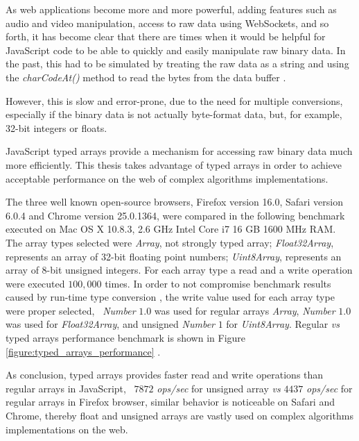 As web applications become more and more powerful, adding features such as audio and video manipulation, access to raw data using WebSockets, and so forth, it has become clear that there are times when it would be helpful for JavaScript code to be able to quickly and easily manipulate raw binary data. In the past, this had to be simulated by treating the raw data as a string and using the \textit{charCodeAt()} method to read the bytes from the data buffer \cite{MDN2013} \cite{TypedArray2013}.

However, this is slow and error-prone, due to the need for multiple conversions, especially if the binary data is not actually byte-format data, but, for example, 32-bit integers or floats.

JavaScript typed arrays provide a mechanism for accessing raw binary data much more efficiently. This thesis takes advantage of typed arrays in order to achieve acceptable performance on the web of complex algorithms implementations.

The three well known open-source browsers, Firefox version 16.0, Safari version 6.0.4 and Chrome version 25.0.1364, were compared in the following benchmark executed on Mac OS X 10.8.3, 2.6 GHz Intel Core i7 16 GB 1600 MHz RAM. The array types selected were \textit{Array}, not strongly typed array; \textit{Float32Array}, represents an array of 32-bit floating point numbers; \textit{Uint8Array}, represents an array of 8-bit unsigned integers. For each array type a read and a write operation were executed $100,000$ times. In order to not compromise benchmark results caused by run-time type conversion \cite{International2009}, the write value used for each array type were proper selected, \eg\ \textit{Number} $1.0$ was used for regular arrays \textit{Array}, \textit{Number} $1.0$ was used for \textit{Float32Array}, and unsigned \textit{Number} $1$ for \textit{Uint8Array}. Regular \textit{vs} typed arrays performance benchmark is shown in Figure \ref{figure:typed_arrays_performance} \cite{TypedArrayPerformance2013}.

As conclusion, typed arrays provides faster read and write operations than regular arrays in JavaScript, \ie\ $7872$ \textit{ops/sec} for unsigned array \textit{vs} $4437$ \textit{ops/sec} for regular arrays in Firefox browser, similar behavior is noticeable on Safari and Chrome, thereby float and unsigned arrays are vastly used on complex algorithms implementations on the web.

